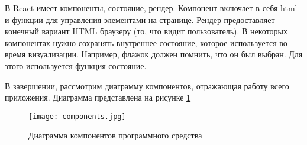 В React имеет компоненты, состояние, рендер. Компонент включает в себя html и функции для управления элементами на странице. Рендер предоставляет конечный вариант HTML браузеру (то, что видит пользователь). В некоторых компонентах нужно сохранять внутреннее состояние, которое используется во время визуализации. Например, флажок должен помнить, что он был выбран. Для этого используется функция состояние.

В завершении, рассмотрим диаграмму компонентов, отражающая работу всего приложения. Диаграмма представлена на рисунке \ref{fig:arch_and_mod::components}

\begin{figure}[!htb]
  \centering
  \texttt{[image: components.jpg]}
  \caption{ Диаграмма компонентов программного средства }
  \label{fig:arch_and_mod::components}
\end{figure}
